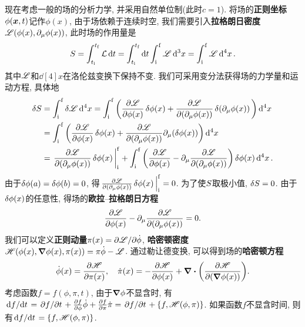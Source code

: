 现在考虑一般的场的分析力学, 并采用自然单位制(此时$ c=1 $). 将场的\textbf{正则坐标}$ \phi(\vb*{x},t) $记作$ \phi(x) $, 由于场依赖于连续时空, 我们需要引入\textbf{拉格朗日密度}$ \mathscr{L}(\phi(x),\partial_{\mu}\phi(x)) $, 此时场的作用量是
\begin{equation*}
    S = \int_{t_{\mathrm{i}}}^{t_{\mathrm{f}}} \mathcal{L} \dd{t} = \int_{t_{\mathrm{i}}}^{t_{\mathrm{f}}} \dd{t} \int_{\mathrm{i}}^{\mathrm{f}} \mathscr{L} \dd[3]{x} = \int_{\mathrm{i}}^{\mathrm{f}} \mathscr{L} \dd[4]{x}.
\end{equation*}
其中$ \mathscr{L} $和$ \dd[4]{x} $在洛伦兹变换下保持不变. 我们可采用变分法获得场的力学量和运动方程, 具体地
\begin{align*}
    \var{\action} &= \int_{\init}^{\fini} \var{\lagrden} \dd[4]{x} = \int_{\init}^{\fini} \bigg( \pdv{\lagrden}{\phi(x)}\var{\phi(x)} + \pdv{\lagrden}{(\partial_{\mu} \phi(x))}\var{(\partial_{\mu} \phi(x))} \bigg) \dd[4]{x} \\
    &= \int_{\init}^{\fini} \bigg( \pdv{\lagrden}{\phi(x)}\var{\phi(x)} + \pdv{\lagrden}{(\partial_{\mu} \phi(x))} \partial_{\mu}(\var{\phi(x)}) \bigg) \dd[4]{x}\\
    &= \eval{\pdv{\lagrden}{(\partial_{\mu} \phi(x))} \var{\phi(x)}}_{\init}^{\fini} + \int_{\init}^{\fini} \bigg( \pdv{\lagrden}{\phi(x)} - \partial_{\mu} \pdv{\lagrden}{(\partial_{\mu} \phi(x))} \bigg)\var{\phi(x)} \dd[4]{x}.
\end{align*}
由于$ \var{\phi(a)}=\var{\phi(b)}=0 $, 得$ \eval{\pdv{\lagrden}{(\partial_{\mu} \phi(x))} \var{\phi(x)}}_{\init}^{\fini}=0 $. 为了使$ S $取极小值, $ \var{S}=0 $. 由于$ \var{\phi(x)} $的任意性, 得场的\textbf{欧拉}--\textbf{拉格朗日方程}
\begin{equation}
    \pdv{\mathscr{L}}{\phi(x)} - \partial_{\mu}\pdv{\mathscr{L}}{(\partial_{\mu} \phi(x))} = 0.
\end{equation}
我们可以定义\textbf{正则动量}$ \pi(x) = {\partial \mathscr{L}}/{\partial \dot{\phi}} $, \textbf{哈密顿密度}$ \mathscr{H}(\phi(x),\grad{\phi(x)},\pi(x)) = \pi\dot{\phi} - \mathscr{L} $. 通过勒让德变换, 可以得到场的\textbf{哈密顿方程}
\begin{equation}
    \dot{\phi}(x) = \pdv{\mathscr{H}}{\pi(x)}, \quad \dot{\pi}(x) = - \pdv{\mathscr{H}}{\phi(x)} + \div {\bigg(\pdv{\mathscr{H}}{(\grad{\phi(x)})}\bigg)}.
\end{equation}
考虑函数$ f=f(\phi,\pi,t) $, 由于$ \grad{\phi} $不显含时, 有$ \dv*{f}{t} = \pdv*{f}{t} + \pdv{f}{\phi}\dot{\phi}+\pdv{f}{\pi}\dot{\pi} = \pdv*{f}{t}+\pb{f}{\hamiden(\phi,\pi)} $. 如果函数$ f $不显含时间, 则有$ \dv*{f}{t} = \pb{f}{\hamiden(\phi,\pi)} $.

